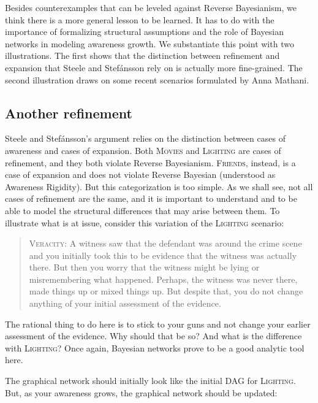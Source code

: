 \documentclass[
  11pt,
  dvipsnames,enabledeprecatedfontcommands]{scrartcl}
\begin{document}
Besides counterexamples that can be leveled against Reverse Bayesianism,
we think there is a more general lesson to be learned. It has to do with
the importance of formalizing structural assumptions and the role of
Bayesian networks in modeling awareness growth. We substantiate this
point with two illustrations. The first shows that the distinction
between refinement and expansion that Steele and Stefánsson rely on is
actually more fine-grained. The second illustration draws on some recent
scenarios formulated by Anna Mathani.

\hypertarget{another-refinement}{%
\subsection{Another refinement}\label{another-refinement}}

\label{sec:structural}

Steele and Stefánsson's argument relies on the distinction between cases
of awareness and cases of expansion. Both \textsc{Movies} and
\textsc{Lighting} are cases of refinement, and they both violate Reverse
Bayesianism. \textsc{Friends}, instead, is a case of expansion and does
not violate Reverse Bayesian (understood as Awareness Rigidity). But
this categorization is too simple. As we shall see, not all cases of
refinement are the same, and it is important to understand and to be
able to model the structural differences that may arise between them. To
illustrate what is at issue, consider this variation of the
\textsc{Lighting} scenario:

\begin{quote}
\textsc{Veracity}: A witness saw that the defendant was around the crime
scene and you initially took this to be evidence that the witness was
actually there. But then you worry that the witness might be lying or
misremembering what happened. Perhaps, the witness was never there, made
things up or mixed things up. But despite that, you do not change
anything of your initial assessment of the evidence.
\end{quote}

\noindent   The rational thing to do here is to stick to your guns and
not change your earlier assessment of the evidence. Why should that be
so? And what is the difference with \textsc{Lighting}? Once again,
Bayesian networks prove to be a good analytic tool here.

The graphical network should initially look like the initial DAG for
\textsc{Lighting}. But, as your awareness grows, the graphical network
should be updated:
\end{document}
